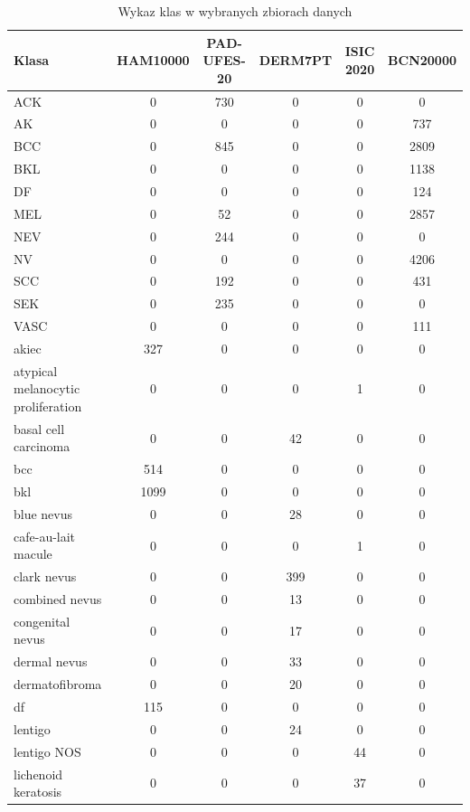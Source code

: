 \begin{table}[htbp]
	\centering
	\small
	\caption{Wykaz klas w wybranych zbiorach danych}
	\renewcommand{\arraystretch}{1}
	\begin{tabular}{|l|c|c|c|c|c|}
		\hline
		\textbf{Klasa} & \textbf{HAM10000} & \textbf{PAD-UFES-20} & \textbf{DERM7PT} & \textbf{ISIC 2020} & \textbf{BCN20000} \\ \hline
		ACK & 0 & 730 & 0 & 0 & 0 \\ \hline
		AK & 0 & 0 & 0 & 0 & 737 \\ \hline
		BCC & 0 & 845 & 0 & 0 & 2809 \\ \hline
		BKL & 0 & 0 & 0 & 0 & 1138 \\ \hline
		DF & 0 & 0 & 0 & 0 & 124 \\ \hline
		MEL & 0 & 52 & 0 & 0 & 2857 \\ \hline
		NEV & 0 & 244 & 0 & 0 & 0 \\ \hline
		NV & 0 & 0 & 0 & 0 & 4206 \\ \hline
		SCC & 0 & 192 & 0 & 0 & 431 \\ \hline
		SEK & 0 & 235 & 0 & 0 & 0 \\ \hline
		VASC & 0 & 0 & 0 & 0 & 111 \\ \hline
		akiec & 327 & 0 & 0 & 0 & 0 \\ \hline
		atypical melanocytic proliferation & 0 & 0 & 0 & 1 & 0 \\ \hline
		basal cell carcinoma & 0 & 0 & 42 & 0 & 0 \\ \hline
		bcc & 514 & 0 & 0 & 0 & 0 \\ \hline
		bkl & 1099 & 0 & 0 & 0 & 0 \\ \hline
		blue nevus & 0 & 0 & 28 & 0 & 0 \\ \hline
		cafe-au-lait macule & 0 & 0 & 0 & 1 & 0 \\ \hline
		clark nevus & 0 & 0 & 399 & 0 & 0 \\ \hline
		combined nevus & 0 & 0 & 13 & 0 & 0 \\ \hline
		congenital nevus & 0 & 0 & 17 & 0 & 0 \\ \hline
		dermal nevus & 0 & 0 & 33 & 0 & 0 \\ \hline
		dermatofibroma & 0 & 0 & 20 & 0 & 0 \\ \hline
		df & 115 & 0 & 0 & 0 & 0 \\ \hline
		lentigo & 0 & 0 & 24 & 0 & 0 \\ \hline
		lentigo NOS & 0 & 0 & 0 & 44 & 0 \\ \hline
		lichenoid keratosis & 0 & 0 & 0 & 37 & 0 \\ \hline

\end{tabular}
\end{table}
